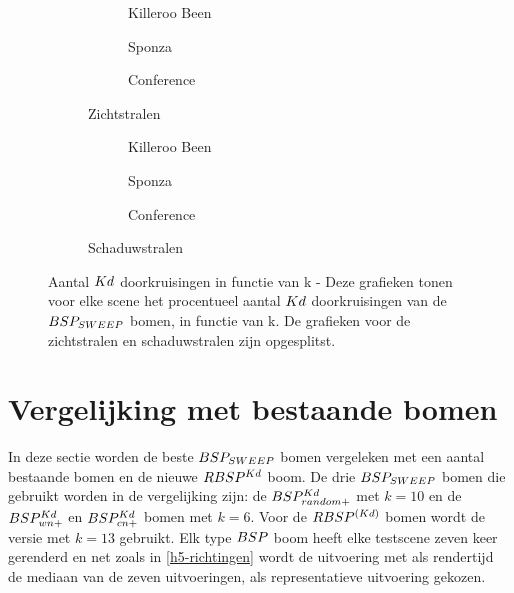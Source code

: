 \begin{figure}
  \centering
  \begin{subfigure}{\linewidth}
  \centering
  \begin{subfigure}[t]{.32\linewidth}
    \centering
{}
\caption{Killeroo Been}
  \end{subfigure}
  \begin{subfigure}[t]{.32\linewidth}
    \centering
{}
\caption{Sponza}
\end{subfigure}
\begin{subfigure}[t]{.32\linewidth}
  \centering
{}
\caption{Conference}
\end{subfigure}
\caption{Zichtstralen}
\end{subfigure}
\begin{subfigure}{\linewidth}
  \centering
  \begin{subfigure}[t]{.32\linewidth}
    \centering
{}
\caption{Killeroo Been}
  \end{subfigure}
  \begin{subfigure}[t]{.32\linewidth}
    \centering
{}
\caption{Sponza}
\end{subfigure}
\begin{subfigure}[t]{.32\linewidth}
  \centering
{}
\caption{Conference}
\end{subfigure}
\caption{Schaduwstralen}
\end{subfigure}
\caption[Aantal $\symKd$ doorkruisingen in functie van k]{Aantal $\symKd$ doorkruisingen in functie van k - \small Deze grafieken tonen voor elke scene het procentueel aantal $\symKd$ doorkruisingen van de $BSP_{SWEEP}$ bomen, in functie van k. De grafieken voor de zichtstralen en schaduwstralen zijn opgesplitst.}
\label{fig:k-kd-doorkruisingen-prec}
\end{figure}


\section{Vergelijking met bestaande bomen}
\label{h5-vergelijken}
In deze sectie worden de beste $BSP_{SWEEP}$ bomen vergeleken met een aantal bestaande bomen en de nieuwe $RBSP^{Kd}$ boom.
De drie $BSP_{SWEEP}$ bomen die gebruikt worden in de vergelijking zijn: de $BSP^{Kd}_{random+}$ met $k = 10$ en de $BSP^{Kd}_{wn+}$ en $BSP^{Kd}_{cn+}$ bomen met $k = 6$.
Voor de $RBSP^{(Kd)}$ bomen wordt de versie met $k = 13$ gebruikt.
Elk type $BSP$ boom heeft elke testscene zeven keer gerenderd en net zoals in \ref{h5-richtingen} wordt de uitvoering met als rendertijd de mediaan van de zeven uitvoeringen, als representatieve uitvoering gekozen.

